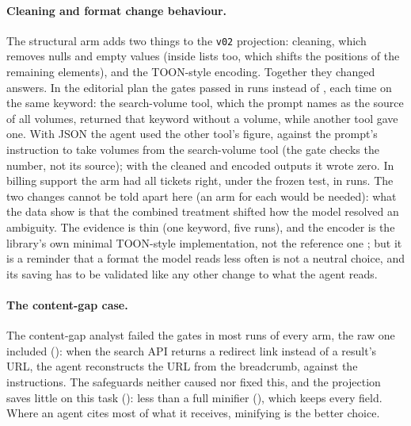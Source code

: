 \paragraph{Cleaning and format change behaviour.} The structural arm adds two things to the \texttt{v02} projection:
cleaning, which removes nulls and empty values (inside lists too, which shifts the positions of the remaining
elements), and the TOON-style encoding. Together they changed answers. In the editorial plan the gates passed in \StudyTwoVtwostructuralGatesi{}
runs instead of \StudyTwoVtwoGatesi, each time on the same keyword: the search-volume tool, which the prompt names as
the source of all volumes, returned that keyword without a volume, while another tool gave one. With JSON the agent
used the other tool's figure, against the prompt's instruction to take volumes from the search-volume tool (the gate
checks the number, not its source); with the cleaned and encoded outputs it wrote zero. In billing support the arm had all tickets
right, under the frozen test, in \StudyTwoFrozenAllRightVtwostructural{} runs. The two changes cannot be told apart here (an arm
for each would be needed): what the data show is that the combined treatment shifted how the model resolved an
ambiguity. The evidence is thin (one keyword, five runs), and the encoder is the
library's own minimal TOON-style implementation, not the reference one \citep{schopplich2026toon}; but it is a
reminder that a format the model reads less often is not a neutral choice, and its saving has to be validated like
any other change to what the agent reads.

\paragraph{The content-gap case.} The content-gap analyst failed the gates in most runs of every arm, the raw one
included (\StudyTwoRawGatesii): when the search API returns a redirect link instead of a result's URL, the agent
reconstructs the URL from the breadcrumb, against the instructions. The safeguards neither caused nor fixed this,
and the projection saves little on this task (\StudyTwoVtwoTokensii): less than a full minifier
(\ReserialMinReplayii), which keeps every field. Where an agent cites most of what it receives, minifying is the
better choice.
